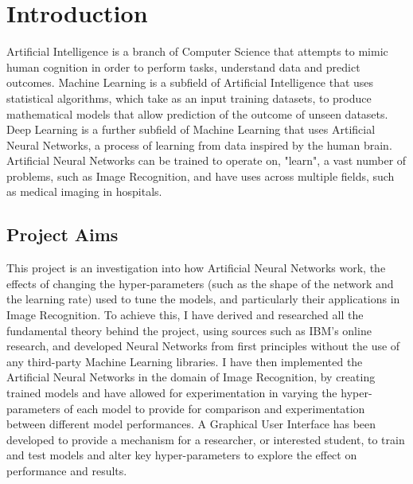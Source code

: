 \documentclass[./project-report/src/latex/project-report.tex]{subfiles}
\begin{document}
\maketitle

\clearpage
\section{Introduction}

Artificial Intelligence is a branch of Computer Science that attempts to mimic human cognition in order to perform tasks, understand data and predict outcomes. 
\cite{hunt2014artificial}
Machine Learning is a subfield of Artificial Intelligence that uses statistical algorithms, which take as an input training datasets, to produce mathematical models 
that allow prediction of the outcome of unseen datasets. Deep Learning is a further subfield of Machine Learning that uses Artificial Neural Networks, a process of 
learning from data inspired by the human brain. Artificial Neural Networks can be trained to operate on, "learn", a vast number of problems, such as Image Recognition, 
and have uses across multiple fields, such as medical imaging in hospitals.

\subsection{Project Aims}

This project is an investigation into how Artificial Neural Networks work, the effects of changing the hyper-parameters (such as the shape of the network and the 
learning rate) used to tune the models, and particularly their applications in Image Recognition. To achieve this, I have derived and researched all the fundamental 
theory behind the project, using sources such as IBM's online research, and developed Neural Networks from first principles without the use of any third-party Machine 
Learning libraries. I have then implemented the Artificial Neural Networks in the domain of Image Recognition, by creating trained models and have allowed for experimentation 
in varying the hyper-parameters of each model to provide for comparison and experimentation between different model performances. A Graphical User Interface has been developed 
to provide a mechanism for a researcher, or interested student, to train and test models and alter key hyper-parameters to explore the effect on performance and results.

\pagebreak
\end{document}
